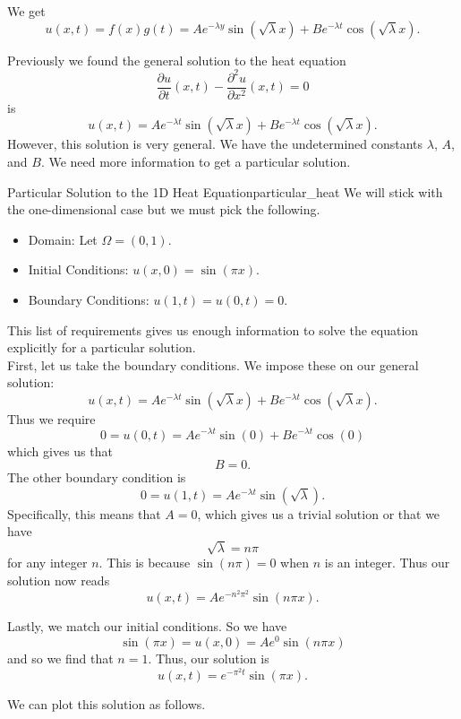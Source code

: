         \begin{answer}
        We get
        \[
        \boxed{u(x,t)=f(x)g(t) = Ae^{-\lambda y}\sin(\sqrt{\lambda}x)+Be^{-\lambda t}\cos(\sqrt{\lambda}x).}
        \]
        \end{answer}
        
        Previously we found the general solution to the heat equation 
        \[
        \frac{\partial u}{\partial t}(x,t) - \frac{\partial^2 u}{\partial x^2} (x,t) = 0
        \]
        is
        \[
        u(x,t)=Ae^{-\lambda t}\sin(\sqrt{\lambda}x)+Be^{-\lambda t}\cos(\sqrt{\lambda}x).
        \]
        However, this solution is very general.  We have the undetermined constants $\lambda$, $A$, and $B$. We need more information to get a particular solution.
        
        \begin{ex}{Particular Solution to the 1D Heat Equation}{particular_heat}
        We will stick with the one-dimensional case but we must pick the following.  
        \begin{itemize}
            \item Domain: Let $\Omega = (0,1)$.
            \item Initial Conditions: $u(x,0)=\sin(\pi x)$.
            \item Boundary Conditions: $u(1,t)=u(0,t)=0$.  
        \end{itemize}
        This list of requirements gives us enough information to solve the equation explicitly for a particular solution.\\
        
        First, let us take the boundary conditions. We impose these on our general solution:
        \[
        u(x,t)=Ae^{-\lambda t}\sin(\sqrt{\lambda}x)+Be^{-\lambda t}\cos(\sqrt{\lambda}x).
        \]
        Thus we require
        \[
        0=u(0,t)=Ae^{-\lambda t}\sin(0)+Be^{-\lambda t}\cos(0)
        \]
        which gives us that
        \[
        B=0.
        \]
        The other boundary condition is
        \[
        0=u(1,t)=Ae^{-\lambda t}\sin(\sqrt{\lambda}).
        \]
        Specifically, this means that $A=0$, which gives us a trivial solution or that we have
        \[
        \sqrt{\lambda}=n\pi
        \]
        for any integer $n$.  This is because $\sin(n\pi)=0$ when $n$ is an integer. Thus our solution now reads
        \[
        u(x,t)=Ae^{-n^2\pi^2}\sin(n\pi x).
        \]
        
        Lastly, we match our initial conditions.  So we have
        \[
        \sin(\pi x)=u(x,0)=A e^0 \sin(n\pi x)
        \]
        and so we find that $n=1$.  Thus, our solution is
        \[
        \boxed{u(x,t)=e^{-\pi^2 t} \sin(\pi x).}
        \] 
        
        We can plot this solution as follows.
        \begin{figure}[H]
        	\centering
        	\def\svgwidth{0.75\columnwidth}
        	
        \end{figure}
        \end{ex}
        
